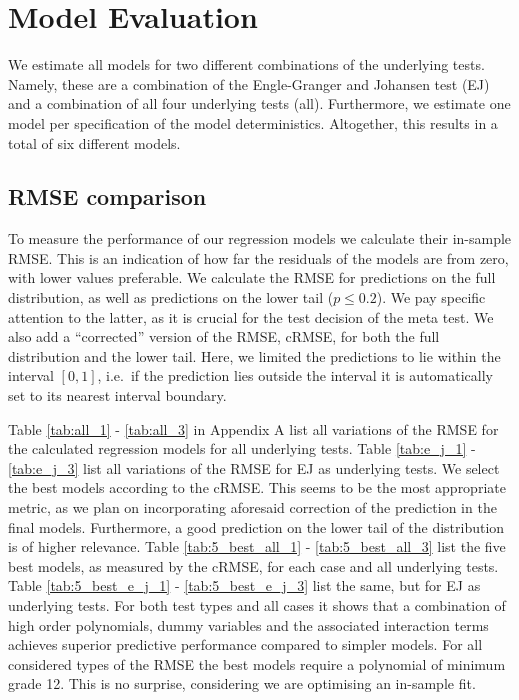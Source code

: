 \documentclass[12pt,a4paper]{article}
\begin{document}
\hypertarget{model-evaluation}{%
\section{Model Evaluation}\label{model-evaluation}}

We estimate all models for two different combinations of the underlying
tests. Namely, these are a combination of the Engle-Granger and Johansen
test (EJ) and a combination of all four underlying tests (all).
Furthermore, we estimate one model per specification of the model
deterministics. Altogether, this results in a total of six different
models.

\hypertarget{rmse-comparison}{%
\subsection{RMSE comparison}\label{rmse-comparison}}

To measure the performance of our regression models we calculate their
in-sample \ac{RMSE}. This is an indication of how far the residuals of
the models are from zero, with lower values preferable. We calculate the
\ac{RMSE} for predictions on the full distribution, as well as
predictions on the lower tail (\(p \leq 0.2\)). We pay specific
attention to the latter, as it is crucial for the test decision of the
meta test. We also add a ``corrected'' version of the \ac{RMSE},
\ac{cRMSE}, for both the full distribution and the lower tail. Here, we
limited the predictions to lie within the interval \([0, 1]\), i.e.~if
the prediction lies outside the interval it is automatically set to its
nearest interval boundary.

Table \ref{tab:all_1} - \ref{tab:all_3} in Appendix A list all
variations of the \ac{RMSE} for the calculated regression models for all
underlying tests. Table \ref{tab:e_j_1} - \ref{tab:e_j_3} list all
variations of the \ac{RMSE} for EJ as underlying tests. We select the
best models according to the \ac{cRMSE}. This seems to be the most
appropriate metric, as we plan on incorporating aforesaid correction of
the prediction in the final models. Furthermore, a good prediction on
the lower tail of the distribution is of higher relevance. Table
\ref{tab:5_best_all_1} - \ref{tab:5_best_all_3} list the five best
models, as measured by the \ac{cRMSE}, for each case and all underlying
tests. Table \ref{tab:5_best_e_j_1} - \ref{tab:5_best_e_j_3} list the
same, but for EJ as underlying tests. For both test types and all cases
it shows that a combination of high order polynomials, dummy variables
and the associated interaction terms achieves superior predictive
performance compared to simpler models. For all considered types of the
\ac{RMSE} the best models require a polynomial of minimum grade 12. This
is no surprise, considering we are optimising an in-sample fit.
\end{document}
